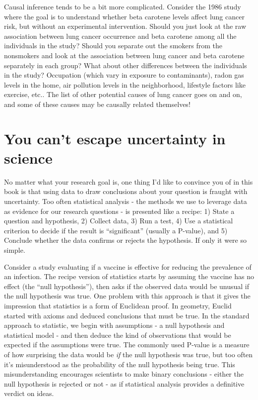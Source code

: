 \documentclass[
]{book}
\begin{document}
Causal inference tends to be a bit more complicated. Consider the 1986 study where the goal is to understand whether beta carotene levels affect lung cancer risk, but without an experimental intervention. Should you just look at the raw association between lung cancer occurrence and beta carotene among all the individuals in the study? Should you separate out the smokers from the nonsmokers and look at the association between lung cancer and beta carotene separately in each group? What about other differences between the individuals in the study? Occupation (which vary in exposure to contaminants), radon gas levels in the home, air pollution levels in the neighborhood, lifestyle factors like exercise, etc.. The list of other potential causes of lung cancer goes on and on, and some of these causes may be causally related themselves!

\section{You can't escape uncertainty in science}\label{you-cant-escape-uncertainty-in-science}

No matter what your research goal is, one thing I'd like to convince you of in this book is that using data to draw conclusions about your question is fraught with uncertainty. Too often statistical analysis - the methods we use to leverage data as evidence for our research questions - is presented like a recipe: 1) State a question and hypothesis, 2) Collect data, 3) Run a test, 4) Use a statistical criterion to decide if the result is ``significant'' (usually a P-value), and 5) Conclude whether the data confirms or rejects the hypothesis. If only it were so simple.

Consider a study evaluating if a vaccine is effective for reducing the prevalence of an infection. The recipe version of statistics starts by assuming the vaccine has no effect (the ``null hypothesis''), then asks if the observed data would be unusual if the null hypothesis was true. One problem with this approach is that it gives the impression that statistics is a form of Euclidean proof. In geometry, Euclid started with axioms and deduced conclusions that must be true. In the standard approach to statistic, we begin with assumptions - a null hypothesis and statistical model - and then deduce the kind of observations that would be expected if the assumptions were true. The commonly used P-value is a measure of how surprising the data would be \emph{if} the null hypothesis was true, but too often it's misunderstood as the probability of the null hypothesis being true. This misunderstanding encourages scientists to make binary conclusions - either the null hypothesis is rejected or not - as if statistical analysis provides a definitive verdict on ideas.
\end{document}
